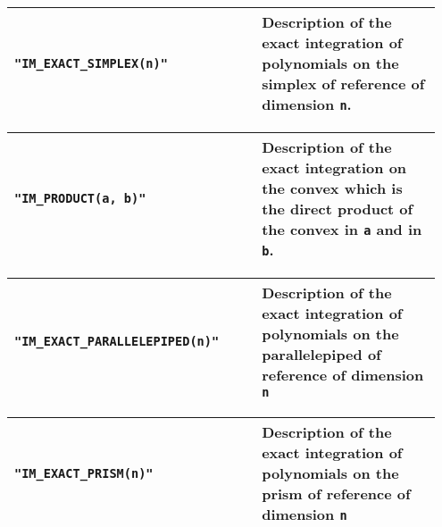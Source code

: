 \begin{center} \begin{tabular}{|m{0.55\linewidth}|m{0.4\linewidth}|} \hline
{\tt "IM_EXACT_SIMPLEX(n)"} & Description of the exact integration of polynomials on the simplex of reference of dimension {\tt n}. \\ \hline
\end{tabular}  
\begin{tabular}{|m{0.55\linewidth}|m{0.4\linewidth}|} \hline
{\tt "IM_PRODUCT(a, b)"} & Description of the exact integration on the convex which is the direct product of the convex in {\tt a} and in {\tt b}.\\ \hline
\end{tabular}  
\begin{tabular}{|m{0.55\linewidth}|m{0.4\linewidth}|} \hline
{\tt "IM_EXACT_PARALLELEPIPED(n)"} & Description of the exact integration of polynomials on the parallelepiped of reference of dimension {\tt n}\\ \hline
\end{tabular}  
\begin{tabular}{|m{0.55\linewidth}|m{0.4\linewidth}|} \hline
{\tt "IM_EXACT_PRISM(n)"} & Description of the exact integration of polynomials on the prism of reference of dimension {\tt n}\\ \hline
\end{tabular} \end{center}
